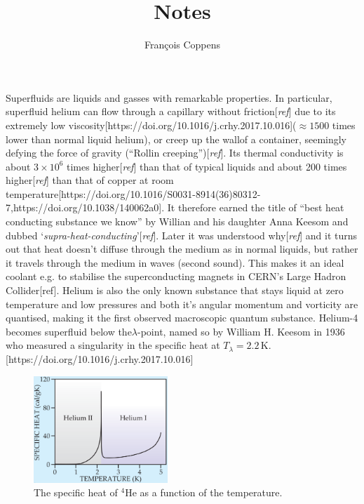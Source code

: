 \documentclass[11pt,a4paper,twoside]{article}
\author{François Coppens}
\title{Notes}
\newcommand{\unit}[1]{\,\mathrm{#1}}
\begin{document}
	Superfluids are liquids and gasses with remarkable properties. In particular, superfluid helium can flow through a capillary without friction[\emph{ref}] due to its extremely low viscosity[https://doi.org/10.1016/j.crhy.2017.10.016]($\approx\!1500$ times lower than normal liquid helium), or creep up the wallof a container, seemingly defying the force of gravity (``Rollin creeping'')[\emph{ref}]. Its thermal conductivity is about $3\times10^6$ times higher[\emph{ref}] than that of typical liquids and about 200 times higher[\emph{ref}] than that of copper at room temperature[https://doi.org/10.1016/S0031-8914(36)80312-7,https://doi.org/10.1038/140062a0]. It therefore earned the title of ``best heat conducting substance we know'' by Willian and his daughter Anna Keesom and dubbed `\emph{supra-heat-conducting}'[\emph{ref}]. Later it was understood why[\emph{ref}] and it turns out that heat doesn't diffuse through the medium as in normal liquids, but rather it travels through the medium in waves (second sound). This makes it an ideal coolant e.g. to stabilise the superconducting magnets in CERN's Large Hadron Collider[ref]. Helium is also the only known substance that stays liquid at zero temperature and low pressures and both it's angular momentum and vorticity are quantised, making it the first observed macroscopic quantum substance. Helium-4 becomes superfluid below the$\lambda$-point, named so by William H. Keesom in 1936 who measured a singularity in the specific heat at $T_\lambda=2.2\unit{K}$.[https://doi.org/10.1016/j.crhy.2017.10.016]\\
	
	\begin{figure}[t]
		\begin{center}
			\includegraphics[width=0.45\textwidth]{specific-heat}
		\end{center}
		\caption{The specific heat of $^4$He as a function of the temperature.}
		\label{fig:specific-heat}
	\end{figure}	
	
\end{document}
